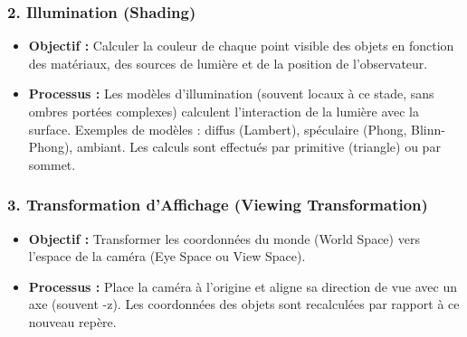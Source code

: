 \documentclass{article}
\begin{document}
\subsubsection{2. Illumination (Shading)}
\begin{itemize}
    \item \textbf{Objectif :} Calculer la couleur de chaque point visible des objets en fonction des matériaux, des sources de lumière et de la position de l'observateur.
    \item \textbf{Processus :} Les modèles d'illumination (souvent locaux à ce stade, sans ombres portées complexes) calculent l'interaction de la lumière avec la surface. Exemples de modèles : diffus (Lambert), spéculaire (Phong, Blinn-Phong), ambiant. Les calculs sont effectués par primitive (triangle) ou par sommet.
\end{itemize}

\subsubsection{3. Transformation d'Affichage (Viewing Transformation)}
\begin{itemize}
    \item \textbf{Objectif :} Transformer les coordonnées du monde (World Space) vers l'espace de la caméra (Eye Space ou View Space).
    \item \textbf{Processus :} Place la caméra à l'origine et aligne sa direction de vue avec un axe (souvent -z). Les coordonnées des objets sont recalculées par rapport à ce nouveau repère.
\end{itemize}
\end{document}
